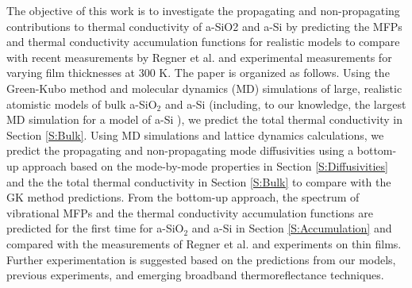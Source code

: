 \documentclass[aps,prb,onecolumn,preprint,superscriptaddress,footinbib,amsmath,amssymb,floatfix]{revtex4}
\begin{document}
The objective of this work is to investigate the propagating 
and non-propagating contributions to thermal conductivity of 
a-SiO2 and a-Si 
by predicting the MFPs and thermal conductivity 
accumulation functions for realistic models to 
compare with recent measurements by Regner et al.
\cite{regner_broadband_2013} and experimental measurements 
for varying film thicknesses at 300 K.
\cite{freeman_thermal_1986,graebner_phonon_1986,
cahill_lattice_1988,cahill_thermal_1989,
love_estimate_1990,cahill_thermal_1994,lee_heat_1997,
yamane_measurement_2002,baldi_thermal_2008,
liu_high_2009,yang_anomalously_2010} The paper is organized as follows. 
Using the Green-Kubo method and 
molecular dynamics (MD) simulations of large, realistic atomistic models 
of bulk a-SiO$_2$ and a-Si (including, to our 
knowledge, the largest MD simulation for a model of a-Si
\cite{barkema_high-quality_2000,he_heat_2011}), 
we predict the total thermal conductivity in Section \ref{S:Bulk}. 
Using MD simulations and lattice dynamics calculations, 
we predict the propagating and non-propagating mode 
diffusivities using a bottom-up approach 
based on the mode-by-mode properties in Section \ref{S:Diffusivities} and 
the the total thermal conductivity in Section \ref{S:Bulk} to compare with 
the GK method predictions. 
From the bottom-up approach, the spectrum of vibrational MFPs and 
the thermal conductivity accumulation functions 
are predicted for the first time 
for a-SiO$_2$ and a-Si in Section \ref{S:Accumulation} and 
compared with the measurements of  
Regner et al.\cite{regner_broadband_2013} and experiments on 
thin films.\cite{freeman_thermal_1986,graebner_phonon_1986,
cahill_lattice_1988,cahill_thermal_1989,
love_estimate_1990,cahill_thermal_1994,lee_heat_1997,
yamane_measurement_2002,baldi_thermal_2008,
liu_high_2009,yang_anomalously_2010} 
Further experimentation 
is suggested based on the predictions from our models, previous 
experiments,
\cite{freeman_thermal_1986,graebner_phonon_1986,
cahill_lattice_1988,cahill_thermal_1989,
love_estimate_1990,cahill_thermal_1994,lee_heat_1997,
yamane_measurement_2002,baldi_thermal_2008,
liu_high_2009,yang_anomalously_2010}
and emerging broadband thermoreflectance techniques.
\cite{koh_frequency_2007,minnich_thermal_2011,regner_broadband_2013,
yang_mean_2013}
\end{document}
